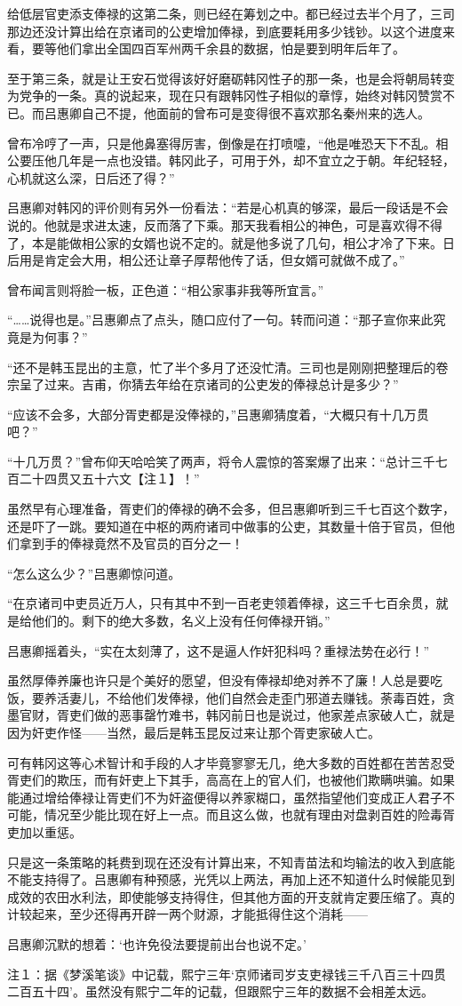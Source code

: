 给低层官吏添支俸禄的这第二条，则已经在筹划之中。都已经过去半个月了，三司那边还没计算出给在京诸司的公吏增加俸禄，到底要耗用多少钱钞。以这个进度来看，要等他们拿出全国四百军州两千余县的数据，怕是要到明年后年了。

至于第三条，就是让王安石觉得该好好磨砺韩冈性子的那一条，也是会将朝局转变为党争的一条。真的说起来，现在只有跟韩冈性子相似的章惇，始终对韩冈赞赏不已。而吕惠卿自己不提，他面前的曾布可是变得很不喜欢那名秦州来的选人。

曾布冷哼了一声，只是他鼻塞得厉害，倒像是在打喷嚏，“他是唯恐天下不乱。相公要压他几年是一点也没错。韩冈此子，可用于外，却不宜立之于朝。年纪轻轻，心机就这么深，日后还了得？”

吕惠卿对韩冈的评价则有另外一份看法：“若是心机真的够深，最后一段话是不会说的。他就是求进太速，反而落了下乘。那天我看相公的神色，可是喜欢得不得了，本是能做相公家的女婿也说不定的。就是他多说了几句，相公才冷了下来。日后用是肯定会大用，相公还让章子厚帮他传了话，但女婿可就做不成了。”

曾布闻言则将脸一板，正色道：“相公家事非我等所宜言。”

“……说得也是。”吕惠卿点了点头，随口应付了一句。转而问道：“那子宣你来此究竟是为何事？”

“还不是韩玉昆出的主意，忙了半个多月了还没忙清。三司也是刚刚把整理后的卷宗呈了过来。吉甫，你猜去年给在京诸司的公吏发的俸禄总计是多少？”

“应该不会多，大部分胥吏都是没俸禄的，”吕惠卿猜度着，“大概只有十几万贯吧？”

“十几万贯？”曾布仰天哈哈笑了两声，将令人震惊的答案爆了出来：“总计三千七百二十四贯又五十六文【注１】！”

虽然早有心理准备，胥吏们的俸禄的确不会多，但吕惠卿听到三千七百这个数字，还是吓了一跳。要知道在中枢的两府诸司中做事的公吏，其数量十倍于官员，但他们拿到手的俸禄竟然不及官员的百分之一！

“怎么这么少？”吕惠卿惊问道。

“在京诸司中吏员近万人，只有其中不到一百老吏领着俸禄，这三千七百余贯，就是给他们的。剩下的绝大多数，名义上没有任何俸禄开销。”

吕惠卿摇着头，“实在太刻薄了，这不是逼人作奸犯科吗？重禄法势在必行！”

虽然厚俸养廉也许只是个美好的愿望，但没有俸禄却绝对养不了廉！人总是要吃饭，要养活妻儿，不给他们发俸禄，他们自然会走歪门邪道去赚钱。荼毒百姓，贪墨官财，胥吏们做的恶事罄竹难书，韩冈前日也是说过，他家差点家破人亡，就是因为奸吏作怪——当然，最后是韩玉昆反过来让那个胥吏家破人亡。

可有韩冈这等心术智计和手段的人才毕竟寥寥无几，绝大多数的百姓都在苦苦忍受胥吏们的欺压，而有奸吏上下其手，高高在上的官人们，也被他们欺瞒哄骗。如果能通过增给俸禄让胥吏们不为奸盗便得以养家糊口，虽然指望他们变成正人君子不可能，情况至少能比现在好上一点。而且这么做，也就有理由对盘剥百姓的险毒胥吏加以重惩。

只是这一条策略的耗费到现在还没有计算出来，不知青苗法和均输法的收入到底能不能支持得了。吕惠卿有种预感，光凭以上两法，再加上还不知道什么时候能见到成效的农田水利法，即使能够支持得住，但其他方面的开支就肯定要压缩了。真的计较起来，至少还得再开辟一两个财源，才能抵得住这个消耗——

吕惠卿沉默的想着：‘也许免役法要提前出台也说不定。’

注１：据《梦溪笔谈》中记载，熙宁三年‘京师诸司岁支吏禄钱三千八百三十四贯二百五十四’。虽然没有熙宁二年的记载，但跟熙宁三年的数据不会相差太远。

